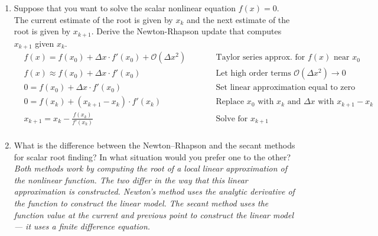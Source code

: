 \begin{enumerate}
  \item Suppose that you want to solve the scalar nonlinear equation $f(x) = 0$. \\
        The current estimate of the root is given by $x_k$
        and the next estimate of the root is given by $x_{k+1}$.
        Derive the Newton-Rhapson update that computes $x_{k+1}$ given $x_k$.
        \\[1em]

        \begin{align*}

          &f(x) = f(x_0) + \Delta x \cdot f'(x_0) + \mathcal{O}(\Delta x^2)
          \quad &\quad
          &\text{Taylor series approx. for $f(x)$ near $x_0$} \\[1em]

          &f(x) \approx f(x_0) + \Delta x \cdot f'(x_0)
          \quad &\quad
          &\text{Let high order terms $\mathcal{O}(\Delta x^2) \to 0$} \\[1em]

          &0 = f(x_0) + \Delta x \cdot f'(x_0)
          \quad &\quad
          &\text{Set linear approximation equal to zero} \\[1em]

          &0 = f(x_k) + (x_{k+1} - x_k) \cdot f'(x_k)
          \quad &\quad
          &\text{Replace $x_0$ with $x_k$ and $\Delta x$ with $x_{k+1} - x_k$ } \\[1em]

          &x_{k+1} = x_k - \frac{f(x_k)}{f'(x_k)}
          \quad &\quad
          &\text{Solve for $x_{k+1}$ } \\[1em]

        \end{align*}


  \item What is the difference between the Newton--Rhapson
        and the secant methods for scalar root finding?
        In what situation would you prefer one to the other?
        \\[2em]

        \textit{Both methods work by computing the root of a local linear
        approximation of the nonlinear function. The two differ in the way that
        this linear approximation is constructed. Newton's method uses the
        analytic derivative of the function to construct the linear model.
        The secant method uses the function value at the current and previous
        point to construct the linear model --- it uses a finite difference
        equation.}
        \\[2em]


\end{enumerate}
